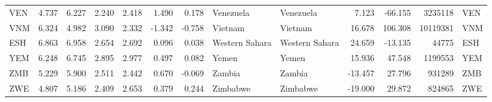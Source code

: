 \begin{tabular}{lrrrrrrllrrrl}
VEN & 4.737 & 6.227 & 2.240 & 2.418 & 1.490 & 0.178 & Venezuela & Venezuela & 7.123 & -66.155 & 3235118 & VEN \\
VNM & 6.324 & 4.982 & 3.090 & 2.332 & -1.342 & -0.758 & Vietnam & Vietnam & 16.678 & 106.308 & 10119381 & VNM \\
ESH & 6.863 & 6.958 & 2.654 & 2.692 & 0.096 & 0.038 & Western Sahara & Western Sahara & 24.659 & -13.135 & 44775 & ESH \\
YEM & 6.248 & 6.745 & 2.895 & 2.977 & 0.497 & 0.082 & Yemen & Yemen & 15.936 & 47.548 & 1199553 & YEM \\
ZMB & 5.229 & 5.900 & 2.511 & 2.442 & 0.670 & -0.069 & Zambia & Zambia & -13.457 & 27.796 & 931289 & ZMB \\
ZWE & 4.807 & 5.186 & 2.409 & 2.653 & 0.379 & 0.244 & Zimbabwe & Zimbabwe & -19.000 & 29.872 & 824865 & ZWE \\
\bottomrule
\end{tabular}

